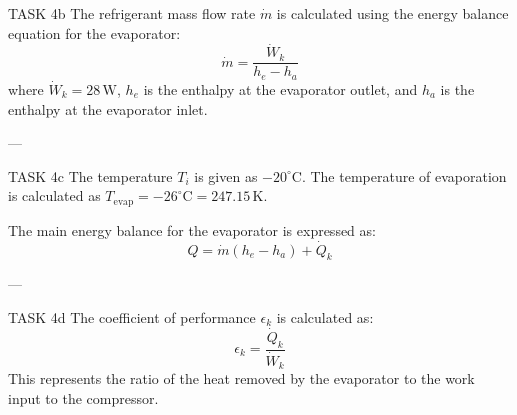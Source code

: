 TASK 4b  
The refrigerant mass flow rate \( \dot{m} \) is calculated using the energy balance equation for the evaporator:  
\[
\dot{m} = \frac{\dot{W}_k}{h_e - h_a}
\]  
where \( \dot{W}_k = 28 \, \text{W} \), \( h_e \) is the enthalpy at the evaporator outlet, and \( h_a \) is the enthalpy at the evaporator inlet.

---

TASK 4c  
The temperature \( T_i \) is given as \( -20^\circ\text{C} \).  
The temperature of evaporation is calculated as \( T_{\text{evap}} = -26^\circ\text{C} = 247.15 \, \text{K} \).

The main energy balance for the evaporator is expressed as:  
\[
Q = \dot{m}(h_e - h_a) + \dot{Q}_k
\]

---

TASK 4d  
The coefficient of performance \( \epsilon_k \) is calculated as:  
\[
\epsilon_k = \frac{\dot{Q}_k}{\dot{W}_k}
\]  
This represents the ratio of the heat removed by the evaporator to the work input to the compressor.